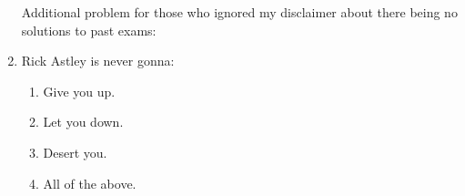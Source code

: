 \documentclass[12pt]{article}
\newcommand{\points}[1]{\marginpar{\hspace{24pt}[#1]}}
\begin{document}
\begin{enumerate}
\vspace*{\fill}

Additional problem for those who ignored my disclaimer about there being no solutions to past exams:

\item Rick Astley is never gonna: \points{0}
\begin{enumerate}
 \item Give you up.
 \item Let you down.
 \item Desert you.
 \item All of the above.
\end{enumerate}

\end{enumerate}
\end{document}

